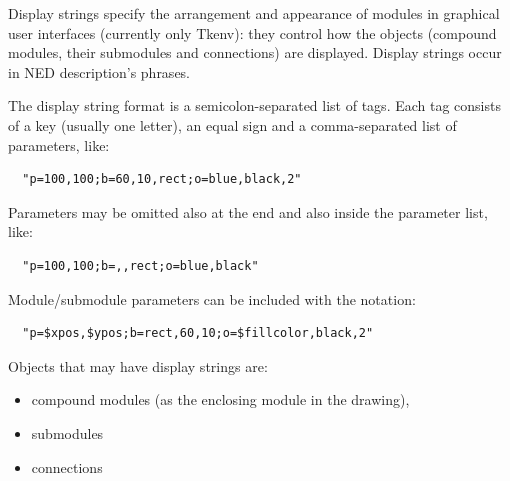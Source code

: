 Display strings specify the arrangement and
appearance of modules in graphical user interfaces (currently only
Tkenv): they control how the objects (compound modules, their
submodules and connections) are displayed. Display strings occur in
NED description's 
phrases.

The display string format is a semicolon-separated list of tags. 
Each tag consists of a key (usually one letter), an equal sign 
and a comma-separated list of parameters, like:

\begin{Verbatim}
  "p=100,100;b=60,10,rect;o=blue,black,2"
\end{Verbatim}  

Parameters may be omitted also at the end and also inside the 
parameter list, like:

\begin{Verbatim}
  "p=100,100;b=,,rect;o=blue,black"
\end{Verbatim}

Module/submodule parameters can be included with the  notation:

\begin{Verbatim}
  "p=$xpos,$ypos;b=rect,60,10;o=$fillcolor,black,2"
\end{Verbatim}

Objects that may have display strings are:
\begin{itemize}
  \item{compound modules (as the enclosing module in the drawing),}
  \item{submodules}
  \item{connections}
\end{itemize}



